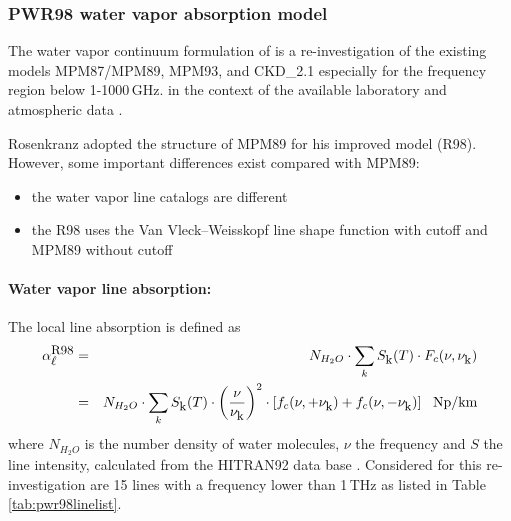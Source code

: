 \subsubsection{PWR98 water vapor absorption model}
\label{leveld:pwr98_h2o}
The water vapor continuum formulation of \citet{pwr:98} is a re-investigation 
of the existing models MPM87/MPM89, MPM93, and CKD\_2.1 especially for 
the frequency region below 1-1000\,GHz. in the context of the available
laboratory and atmospheric data \citep{abaueretal:89, abaueretal:93, 
abaueretal:95, beckerautler:46, englishetal:94, godonetal:92,
liebe:84, liebeandlayton:87, westwateretal:90}.

Rosenkranz adopted the structure of MPM89 for his improved model (R98). 
However, some important differences exist compared with MPM89:
\begin{itemize}
\item the water vapor line catalogs are different 
\item the R98 uses the Van Vleck--Weisskopf line shape function with 
      cutoff and MPM89 without cutoff
\end{itemize}


\paragraph{Water vapor line absorption:}
\label{levele:pwr98_h2oline}
The local line absorption is defined as 
\begin{eqnarray} 
 \label{eq:abs_theory:pwr98absline}
 \alpha^{\mbox{\rm \small R98}}_{\mbox{\small $\ell$}} &=& N_{H_2O} \cdot \sum_k S_{\mbox{\rm \small k}}(T) \cdot F_{c}(\nu,\nu_{\mbox{\rm \small k}}) \nonumber\\
            &=& N_{H_2O} \cdot \sum_k S_{\mbox{\rm \small k}}(T) \cdot 
                \left (\displaystyle{\frac{\nu}{\nu_{\mbox{\rm \small k}}}}\right )^2  \cdot 
                \left [f_{c}(\nu,+\nu_{\mbox{\rm \small k}}) + f_{c}(\nu,-\nu_{\mbox{\rm \small k}}) \right]~~\mbox{Np/km}
\end{eqnarray}
where $N_{H_2O}$ is the number density of water molecules, $\nu$ the
frequency and $S$ the line intensity, calculated from the HITRAN92
data base \citet{rothman:92}. Considered for this re-investigation are 
15 lines with a frequency lower than 1\,THz as listed in 
Table \ref{tab:pwr98linelist}.


